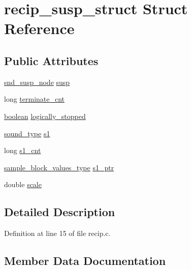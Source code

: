 \hypertarget{structrecip__susp__struct}{}\section{recip\+\_\+susp\+\_\+struct Struct Reference}
\label{structrecip__susp__struct}
\subsection*{Public Attributes}
\begin{DoxyCompactItemize}
\item 
\hyperlink{sound_8h_a6b268203688a934bd798ceb55f85d4c0}{snd\+\_\+susp\+\_\+node} \hyperlink{structrecip__susp__struct_a5212739dd1ad43966a7a9d0992ea3656}{susp}
\item 
long \hyperlink{structrecip__susp__struct_a92e5951c8c47c33f7fb2516cbce57e78}{terminate\+\_\+cnt}
\item 
\hyperlink{cext_8h_a7670a4e8a07d9ebb00411948b0bbf86d}{boolean} \hyperlink{structrecip__susp__struct_a701c85bf9f93a937e47bdd7bad877304}{logically\+\_\+stopped}
\item 
\hyperlink{sound_8h_a792cec4ed9d6d636d342d9365ba265ea}{sound\+\_\+type} \hyperlink{structrecip__susp__struct_a714eb98ced5568cad610d1fcb068a579}{s1}
\item 
long \hyperlink{structrecip__susp__struct_a38bcf2fe43d6f9bec3c91b4ca753953d}{s1\+\_\+cnt}
\item 
\hyperlink{sound_8h_a83d17f7b465d1591f27cd28fc5eb8a03}{sample\+\_\+block\+\_\+values\+\_\+type} \hyperlink{structrecip__susp__struct_a6614edeced711b9362d59034ebd5b3c9}{s1\+\_\+ptr}
\item 
double \hyperlink{structrecip__susp__struct_a0ad922af2222f2d25bd8aac11643fe7f}{scale}
\end{DoxyCompactItemize}


\subsection{Detailed Description}


Definition at line 15 of file recip.\+c.



\subsection{Member Data Documentation}
